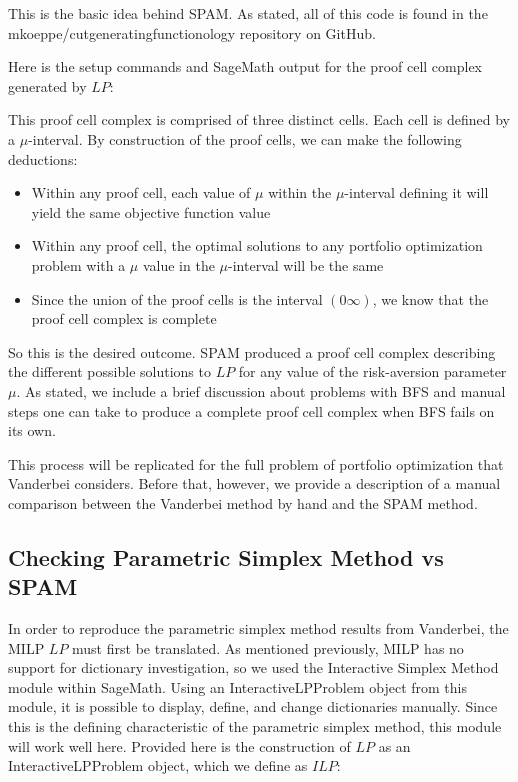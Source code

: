 \documentclass{article}
\begin{document}
This is the basic idea behind SPAM. As stated, all of this code is found in the mkoeppe/cutgeneratingfunctionology repository on GitHub.

Here is the setup commands and SageMath output for the proof cell complex generated by $LP$:



This proof cell complex is comprised of three distinct cells. Each cell is defined by a $\mu$-interval. By construction of the proof cells, we can make the following deductions:
\begin{itemize}
    \item Within any proof cell, each value of $\mu$ within the $\mu$-interval defining it will yield the same objective function value
    \item Within any proof cell, the optimal solutions to any portfolio optimization problem with a $\mu$ value in the $\mu$-interval will be the same
    \item Since the union of the proof cells is the interval $(0\infty)$, we know that the proof cell complex is complete
\end{itemize}

So this is the desired outcome. SPAM produced a proof cell complex describing the different possible solutions to $LP$ for any value of the risk-aversion parameter $\mu$. As stated, we include a brief discussion about problems with BFS and manual steps one can take to produce a complete proof cell complex when BFS fails on its own.

This process will be replicated for the full problem of portfolio optimization that Vanderbei considers. Before that, however, we provide a description of a manual comparison between the Vanderbei method by hand and the SPAM method. 

\subsection{Checking Parametric Simplex Method vs SPAM}

In order to reproduce the parametric simplex method results from Vanderbei, the MILP $LP$ must first be translated. As mentioned previously, MILP has no support for dictionary investigation, so we used the Interactive Simplex Method module within SageMath. Using an InteractiveLPProblem object from this module, it is possible to display, define, and change dictionaries manually. Since this is the defining characteristic of the parametric simplex method, this module will work well here. Provided here is the construction of $LP$ as an InteractiveLPProblem object, which we define as $ILP$:
\end{document}

